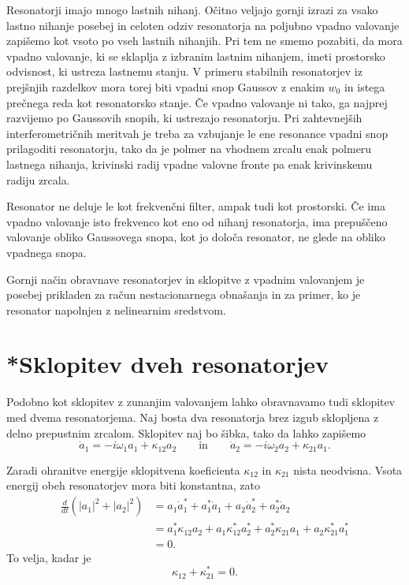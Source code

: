 Resonatorji imajo mnogo lastnih nihanj. Očitno veljajo gornji izrazi
za vsako lastno nihanje posebej in celoten odziv resonatorja na poljubno vpadno
valovanje zapišemo kot vsoto po vseh lastnih nihanjih. Pri tem ne smemo pozabiti,
da mora vpadno valovanje, ki se sklaplja z izbranim lastnim nihanjem,
imeti prostorsko odvisnost, ki ustreza lastnemu stanju. V primeru
stabilnih resonatorjev iz prejšnjih razdelkov mora torej biti vpadni
snop Gaussov z enakim $w_{0}$ in istega prečnega reda kot resonatorsko
stanje. Če vpadno valovanje ni tako, ga najprej razvijemo po
Gaussovih snopih, ki ustrezajo resonatorju.
Pri zahtevnejših interferometričnih meritvah je treba za vzbujanje le ene 
resonance vpadni snop prilagoditi resonatorju, tako da je polmer na vhodnem 
zrcalu enak polmeru lastnega nihanja, krivinski radij vpadne valovne fronte 
pa enak krivinskemu radiju zrcala. 

Resonator ne deluje le kot frekvenčni filter, ampak tudi
kot prostorski. Če ima vpadno valovanje isto frekvenco kot
eno od nihanj resonatorja, ima prepuščeno valovanje obliko
Gaussovega snopa, kot jo določa resonator, ne glede na obliko vpadnega
snopa.

Gornji način obravnave resonatorjev in sklopitve z vpadnim valovanjem
je posebej prikladen za račun nestacionarnega obnašanja in za primer,
ko je resonator napolnjen z nelinearnim sredstvom.

\section{*Sklopitev dveh resonatorjev}
Podobno kot sklopitev z zunanjim valovanjem lahko obravnavamo tudi
sklopitev med dvema resonatorjema. Naj bosta dva resonatorja brez izgub
sklopljena z delno prepustnim zrcalom. Sklopitev naj bo šibka, tako da lahko zapišemo 
\begin{equation}
\dot{a}_{1} =  -i\omega_{1}a_{1}+\kappa_{12}a_{2} \qquad \mathrm{in} \qquad 
\dot{a}_{2} = -i\omega_{2}a_{2}+\kappa_{21}a_{1}.
\end{equation}

Zaradi ohranitve energije sklopitvena koeficienta $\kappa_{12}$ in
$\kappa_{21}$ nista neodvisna. Vsota energij obeh resonatorjev mora
biti konstantna, zato 
\begin{align}
\frac{d}{dt}(|a_{1}|^{2}+|a_{2}|^{2}) & =  a_{1}\dot{a}_{1}^{*}+a_{1}^{*}\dot{a}_{1}+
a_{2}\dot{a}_{2}^{*}+a_{2}^{*}\dot{a}_{2}\nonumber \\
 & =  a_{1}^{*}\kappa_{12}a_{2}+a_{1}\kappa_{12}^{*}a_{2}^{*}+a_{2}^{*}\kappa_{21}a_{1}+
 a_{2}\kappa_{21}^{*}a_{1}^{*}\nonumber \\
 & =  0.
\end{align}
To velja, kadar je 
\begin{equation}
\kappa_{12}+\kappa_{21}^{*}=0.
\label{3.56}
\end{equation}

